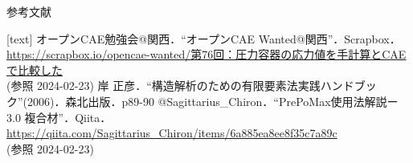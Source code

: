 \begin{frame}{参考文献}
  \begin{thebibliography}{9}
     [text]
      オープンCAE勉強会@関西．“オープンCAE Wanted@関西”．Scrapbox． \\
         {\scriptsize \fontsize{10pt}{10pt}  \color{cud_orange}
          \url{https://scrapbox.io/opencae-wanted/第76回：圧力容器の応力値を手計算とCAEで比較した}} \\
          (参照 2024-02-23)
      岸 正彦．“構造解析のための有限要素法実践ハンドブック”(2006)．森北出版．p89-90
      @Sagittarius\_Chiron．“PrePoMax使用法解説ー3.0 複合材”．Qiita．\\
           {\footnotesize {} \color{cud_orange}
           \url{https://qiita.com/Sagittarius_Chiron/items/6a885ea8ee8f35c7a89c}} \\
           (参照 2024-02-23)
  \end{thebibliography}
\end{frame}
